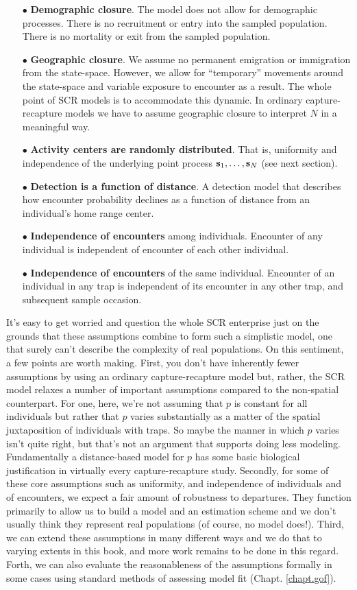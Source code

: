 \begin{itemize}
\item[$\bullet$] {\bf Demographic closure}. The model does not allow
  for demographic processes.  There is no recruitment or entry into
  the sampled population. There is no mortality or exit from the
  sampled population.
\item[$\bullet$] {\bf Geographic closure}.  We assume no permanent
  emigration or immigration from the state-space. However, we allow
  for ``temporary'' movements around the state-space and variable
  exposure to encounter as a result. 
The whole point of SCR models
  is to accommodate this dynamic. In ordinary capture-recapture models
  we have to assume geographic closure to interpret $N$ in a
  meaningful way.
\item[$\bullet$] {\bf Activity centers are randomly distributed}. That
  is, uniformity and independence of the underlying point process
  ${\bf s}_{1},\ldots, {\bf s}_{N}$ (see next section).
\item[$\bullet$] {\bf Detection is a function of distance}.  A
  detection model that describes how
  encounter probability declines as a function of distance from an
  individual's home range center.
\item[$\bullet$] {\bf Independence of encounters} among
  individuals. Encounter of any individual is independent of encounter
  of each other individual.
\item[$\bullet$] {\bf Independence of encounters} of the same
  individual. Encounter of an individual in any trap is independent of
  its encounter in any other trap, and
  subsequent sample occasion.
\end{itemize}
It's easy to get worried and question the whole SCR enterprise just
on the grounds that these assumptions combine to form such a simplistic model, one
that surely can't describe the complexity of real populations.  On
this sentiment, a few points are worth making. First, you don't
have inherently fewer assumptions by using an ordinary
capture-recapture model but, rather, the SCR model relaxes a number of
important assumptions compared to the non-spatial counterpart.  For
one, here, we're not assuming that $p$ is constant for all individuals
but rather that $p$ varies substantially as a matter of the spatial
juxtaposition of individuals with traps. So maybe the manner in which
$p$ varies isn't quite right, but that's not an argument that supports
doing less modeling.  Fundamentally a distance-based model for $p$ has
some basic biological justification in virtually every
capture-recapture study.  Secondly, for some of these core
assumptions such as uniformity, and
independence of individuals and of encounters, we expect a fair amount
of robustness to departures. They function primarily to allow us to
build a model and an estimation scheme and we don't usually think they represent
real populations (of course, no model does!).
Third, we can extend these assumptions
in many different ways and we do that to varying extents in this book,
and more work remains to be done in this regard.  Forth, we can also
evaluate the reasonableness of the assumptions formally in some cases
using standard methods of assessing model fit
(Chapt. \ref{chapt.gof}).

